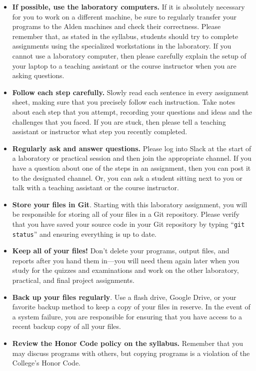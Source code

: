 \vspace*{-.1in}
\begin{itemize}
  \setlength{\itemsep}{-.01in}

  \item {\bf If possible, use the laboratory computers.} If it is absolutely necessary for you to work on a different
    machine, be sure to regularly transfer your programs to the Alden machines and check their correctness. Please
    remember that, as stated in the syllabus, students should try to complete assignments using the specialized
    workstations in the laboratory. If you cannot use a laboratory computer, then please carefully explain the setup of
    your laptop to a teaching assistant or the course instructor when you are asking questions.

  \item {\bf Follow each step carefully.} Slowly read each sentence in every assignment sheet, making sure that you
    precisely follow each instruction. Take notes about each step that you attempt, recording your questions and ideas
    and the challenges that you faced. If you are stuck, then please tell a teaching assistant or instructor what step
    you recently completed.

  \item {\bf Regularly ask and answer questions.} Please log into Slack at the start of a laboratory or practical
    session and then join the appropriate channel. If you have a question about one of the steps in an assignment, then
    you can post it to the designated channel. Or, you can ask a student sitting next to you or talk with a teaching
    assistant or the course instructor.

  \item {\bf Store your files in Git}. Starting with this laboratory assignment, you will be responsible for storing all
    of your files in a Git repository. Please verify that you have saved your source code in your Git repository by
    typing ``{\tt git status}'' and ensuring everything is up to date.

  \item {\bf Keep all of your files!} Don't delete your programs, output files, and reports after you hand them in---you
    will need them again later when you study for the quizzes and examinations and work on the other laboratory,
    practical, and final project assignments.

  \item {\bf Back up your files regularly}. Use a flash drive, Google Drive, or your favorite backup method to keep a
    copy of your files in reserve. In the event of a system failure, you are responsible for ensuring that you have
    access to a recent backup copy of all your files.

  \item {\bf Review the Honor Code policy on the syllabus.} Remember that you may discuss programs with others, but
    copying programs is a violation of the College's Honor Code.

\end{itemize}

